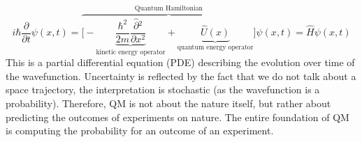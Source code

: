   $$i\hbar \frac{\partial {}}{\partial {t}}\psi(x,t) = \overbrace{\biggl[-\underbrace{\frac{\hbar^2}{2m}\frac{\hat{\partial} {^2}}{\partial {x^2}}}_{\text{kinetic energy operator}}+\underbrace{\hat{U}(x)}_{\text{quantum energy operator}}\biggr]}^{\text{Quantum Hamiltonian}}\psi(x,t) = \hat{H}\psi(x,t)$$
  This is a partial differential equation (PDE) describing the evolution over time of the wavefunction. Uncertainty is reflected by the fact that we do not talk about a space trajectory, the interpretation is stochastic (as the wavefunction is a probability). Therefore, QM is not about the nature itself, but rather about predicting the outcomes of experiments on nature. The entire foundation of QM is computing the probability for an outcome of an experiment. 
